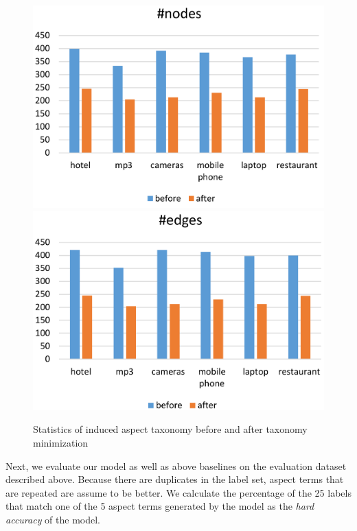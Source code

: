 \begin{figure}[h]
	\centering
	\includegraphics[width=0.48\columnwidth]{figures/1.pdf}
	\includegraphics[width=0.48\columnwidth]{figures/2.pdf}
	\caption{Statistics of induced aspect taxonomy before and after taxonomy minimization}
	\label{fig:size}
	\vspace{-10pt}
\end{figure}


Next, we evaluate our model as well as above baselines on the evaluation dataset described above. Because there are duplicates in the label set, aspect terms
that are repeated are assume to be better.
We calculate the percentage of the 25 labels that 
match one of the 5 aspect terms generated by the model 
as the \textit{hard accuracy} 
of the model. 

